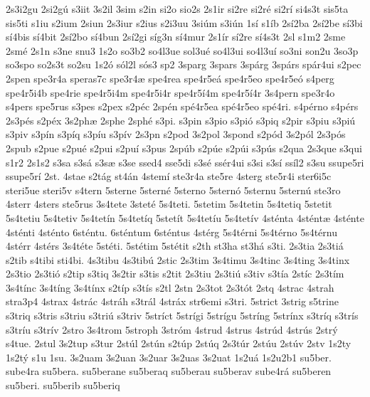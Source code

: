 {2s3i2gu
2si2g^^fa
s3iit
3s2il
3sim
s2in
si2o
sio2s
2s1ir
si2re
si2r^^e9
si2r^^ed
si4s3t
sis5ta
sis5ti
s1iu
s2ium
2siun
2s3iur
s2ius
s2i3uu
3si^^fam
s3i^^fan
1s^^ed
s1^^edb
2s^^ed2ba
2s^^ed2be
s^^ed3bi
s^^ed4bis
s^^ed4bit
2s^^ed2bo
s^^ed4bun
2s^^ed2gi
s^^edg3n
s^^ed4mur
2s1^^edr
s^^ed2re
s^^ed4s3t
2sl
s1m2
2sme
2sm^^e9
2s1n
s3ne
snu3
1s2o
so3b2
so4l3ue
sol3u^^e9
so4l3ui
so4l3u^^ed
so3ni
son2u
3so3p
so3spo
so2s3t
so2su
1s2^^f3
s^^f3l2l
s^^f3s3
sp2
3sparg
3spars
3sp^^e1rg
3sp^^e1rs
sp^^e1r4ui
s2pec
2spen
spe3r4a
speras7c
spe3r4^^e6
spe4rea
spe4r5e^^e1
spe4r5eo
spe4r5e^^f3
s4perg
spe4r5i4b
spe4rie
spe4r5i4m
spe4r5i4r
spe4r5^^ed4m
spe4r5^^ed4r
3s4pern
spe3r4o
s4pers
spe5rus
s3pes
s2pex
s2p^^e9c
2sp^^e9n
sp^^e94r5ea
sp^^e94r5eo
sp^^e94ri.
s4p^^e9rno
s4p^^e9rs
2s3p^^e9s
s2p^^e9x
3s2ph^^e6
2sphe
2sph^^e9
s3pi.
s3pin
s3pio
s3pi^^f3
s3piq
s2pir
s3piu
s3pi^^fa
s3piv
s3p^^edn
s3p^^edq
s3p^^edu
s3p^^edv
2s3pn
s2pod
3s2pol
3spond
s2p^^f3d
3s2p^^f3l
2s3p^^f3s
2spub
s2pue
s2pu^^e9
s2pui
s2pu^^ed
s3pus
2sp^^fab
s2p^^fae
s2p^^fai
s3p^^fas
s2qua
2s3que
s3qui
s1r2
2s1s2
s3sa
s3s^^e1
s3s^^e6
s3se
ssed4
sse5di
s3s^^e9
ss^^e9r4ui
s3si
s3s^^ed
ss^^edl2
s3su
ssupe5ri
ssupe5r^^ed
2st.
4stae
s2t^^e1g
st4^^e1n
4stem^^ed
ste3r4a
ste5re
4sterg
ste5r4i
ster6i5c
steri5ue
steri5v
s4tern
5sterne
5stern^^e9
5sterno
5stern^^f3
5sternu
5stern^^fa
ste3ro
4sterr
4sters
ste5rus
3s4tete
3stet^^e9
5s4teti.
5stetim
5s4tetin
5s4tetiq
5stetit
5s4tetiu
5s4tetiv
5s4tet^^edn
5s4tet^^edq
5stet^^edt
5s4tet^^edu
5s4tet^^edv
4st^^e9nta
4st^^e9nt^^e6
4st^^e9nte
4st^^e9nti
4st^^e9nto
6st^^e9ntu.
6st^^e9ntum
6st^^e9ntus
4st^^e9rg
5s4t^^e9rni
5s4t^^e9rno
5s4t^^e9rnu
4st^^e9rr
4st^^e9rs
3s4t^^e9te
5st^^e9ti.
5st^^e9tim
5st^^e9tit
s2th
st3ha
st3h^^e1
s3ti.
2s3tia
2s3ti^^e1
s2tib
s4tibi
sti4bi.
4s3tibu
4s3tib^^fa
2stic
2s3tim
3s4timu
3s4tinc
3s4ting
3s4tinx
2s3tio
2s3ti^^f3
s2tip
s3tiq
3s2tir
s3tis
s2tit
2s3tiu
2s3ti^^fa
s3tiv
s3t^^eda
2st^^edc
2s3t^^edm
3s4t^^ednc
3s4t^^edng
3s4t^^ednx
s2t^^edp
s3t^^eds
s2tl
2stn
2s3tot
2s3t^^f3t
2stq
4strac
4strah
stra3p4
4strax
4str^^e1c
4str^^e1h
s3tr^^e1l
4str^^e1x
str6emi
s3tri.
5strict
3strig
s5trine
s3triq
s3tris
s3triu
s3tri^^fa
s3triv
5str^^edct
5str^^edgi
5str^^edgu
5str^^edng
5str^^ednx
s3tr^^edq
s3tr^^eds
s3tr^^edu
s3tr^^edv
2stro
3s4trom
5stroph
3str^^f3m
4strud
4strus
4str^^fad
4str^^fas
2str^^fd
s4tue.
2stul
3s2tup
s3tur
2st^^fal
2st^^fan
s2t^^fap
2st^^faq
2s3t^^far
2st^^fau
2st^^fav
2stv
1s2ty
1s2t^^fd
s1u
1su.
3s2uam
3s2uan
3s2uar
3s2uas
3s2uat
1s2u^^e1
1s2u2b1
su5ber.
sube4ra
su5bera.
su5berane
su5beraq
su5berau
su5berav
sube4r^^e1
su5beren
su5beri.
su5berib
su5beriq
}
